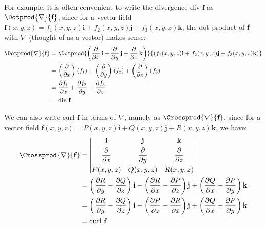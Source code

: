 For example, it is often convenient to write the divergence $\text{div }\textbf{f}$ as $\Dotprod{\nabla}{\textbf{f}}$, since for a vector field $\textbf{f}(x,y,z) = f_1(x,y,z)\textbf{i} + f_2(x,y,z) \textbf{j} + f_3(x,y,z) \textbf{k}$, the dot product of \textbf{f} with $\nabla$ (thought of as a vector) makes sense:
\begin{align*}
 \Dotprod{\nabla}{\textbf{f}} &= \Dotprod{ \left( \frac{\partial}{\partial x}\,\textbf{i} +
  \frac{\partial}{\partial y}\,\textbf{j} + \frac{\partial}{\partial z}\,\textbf{k} \right) }{\left( f_1(x,y,z)
  \textbf{i} + f_2(x,y,z) \textbf{j} + f_3(x,y,z) \textbf{k} \right) }\\
   &= \left( \frac{\partial}{\partial x} \right) (f_1) +
    \left( \frac{\partial}{\partial y} \right) (f_2) +
    \left( \frac{\partial}{\partial z} \right) (f_3)\\
   &= \frac{\partial f_1}{\partial x} + \frac{\partial f_2}{\partial y} +
  \frac{\partial f_3}{\partial z}\\
   &= \text{div }\textbf{f}
\end{align*}

We can also write $\text{curl }\textbf{f}$ in terms of $\nabla$, namely as $\Crossprod{\nabla}{\textbf{f}}$, since for a vector field $\textbf{f}(x,y,z) = P(x,y,z)\textbf{i} + Q(x,y,z)\textbf{j} + R(x,y,z)\textbf{k}$, we have:
\begin{align*}
 \Crossprod{\nabla}{\textbf{f}} &=
 \begin{vmatrix}
  \textbf{i} & \textbf{j} & \textbf{k} \vspace{1mm}\\ \dfrac{\partial}{\partial x} & \dfrac{\partial}{\partial y} &
   \dfrac{\partial}{\partial z} \vspace{1mm}\\
  P(x,y,z) & Q(x,y,z) & R(x,y,z)
 \end{vmatrix}\\
 &= \left( \frac{\partial R}{\partial y} - \frac{\partial Q}{\partial z} \right) \textbf{i} -
    \left( \frac{\partial R}{\partial x} - \frac{\partial P}{\partial z} \right) \textbf{j} +
    \left( \frac{\partial Q}{\partial x} - \frac{\partial P}{\partial y} \right) \textbf{k}\\
 &= \left( \frac{\partial R}{\partial y} - \frac{\partial Q}{\partial z} \right) \textbf{i} +
    \left( \frac{\partial P}{\partial z} - \frac{\partial R}{\partial x} \right) \textbf{j} +
    \left( \frac{\partial Q}{\partial x} - \frac{\partial P}{\partial y} \right) \textbf{k}\\
 &= \text{curl }\textbf{f}
\end{align*}


